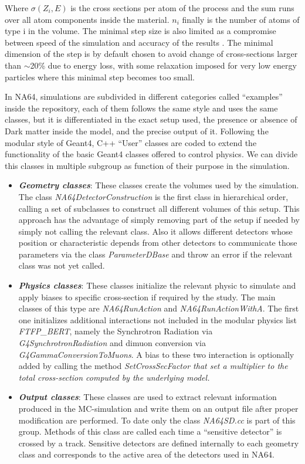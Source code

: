 Where $\sigma(Z_i,E)$ is the cross sections per atom of the process and the sum runs over all atom components inside the material. $n_i$ finally is the number of atoms of type i in the volume. The minimal step size is also limited as a compromise between speed of the simulation and accuracy of the results \cite{geant4-phys-guide}. The minimal dimension of the step is by default chosen to avoid change of cross-sections larger than $\sim$20\% due to energy loss, with some relaxation imposed for very low energy particles where this minimal step becomes too small.

In NA64, simulations are subdivided in different categories called ``examples'' inside the repository, each of them follows the same style and uses the same classes, but it is differentiated in the exact setup used, the presence or absence of Dark matter inside the model, and the precise output of it. Following the modular style of Geant4, C++ ``User'' classes are coded to extend the functionality of the basic Geant4 classes offered to control physics. We can divide this classes in multiple subgroup as function of their purpose in the simulation.

\begin{itemize}
\item \textbf{\textit{Geometry classes}}: These classes create the volumes used by the simulation. The class \textit{NA64DetectorConstruction} is the first class in hierarchical order, calling a set of subclasses to construct all different volumes of this setup. This approach has the advantage of simply removing part of the setup if needed by simply not calling the relevant class. Also it allows different detectors whose position or characteristic depends from other detectors to communicate those parameters via the class \textit{ParameterDBase} and throw an error if the relevant class was not yet called.
\item \textbf{\textit{Physics classes}}: These classes initialize the relevant physic to simulate and apply biases to specific cross-section if required by the study. The main classes of this type are \textit{NA64RunAction} and \textit{NA64RunActionWithA}. The first one initializes additional interactions not included in the modular physics list \textit{FTFP\_BERT}, namely the Synchrotron Radiation via \textit{G4SynchrotronRadiation} and dimuon conversion via \textit{G4GammaConversionToMuons}. A bias to these two interaction is optionally added by calling the method \it{SetCrossSecFactor} that set a multiplier to the total cross-section computed by the underlying model.
\item \textbf{\textit{Output classes}}: These classes are used to extract relevant information produced in the MC-simulation and write them on an output file after proper modification are performed. To date only the class \textit{NA64SD.cc} is part of this group. Methods of this class are called each time a ``sensitive detector'' is crossed by a track. Sensitive detectors are defined internally to each geometry class and corresponds to the active area of the detectors used in NA64.
\end{itemize}


